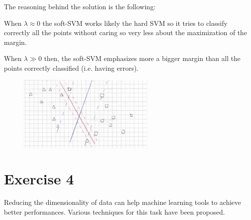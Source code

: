 \documentclass[a4paper,11pt,oneside]{book}
\begin{document}
\begin{enumerate}
    \begin{solution}
        The reasoning behind the solution is the following:
        
        When $\lambda \approx 0$ the soft-SVM works likely the hard SVM so it tries to classify correctly all the points without caring so very less about the maximization of the margin.
        
        When $\lambda \gg 0$ then, the soft-SVM emphasizes more a bigger margin than all the points correctly classified (i.e. having errors).
        
        \begin{figure}[H]
            \centering
            \includegraphics[width=0.6\textwidth,height=0.5\textheight,keepaspectratio]{images/3_3_4_Sept_2019.png}
         \end{figure}
    \end{solution}
\end{enumerate}

\clearpage
\section{Exercise 4}
Reducing the dimensionality of data can help machine learning tools to achieve better performances. Various techniques for this task have been proposed.
\end{document}
